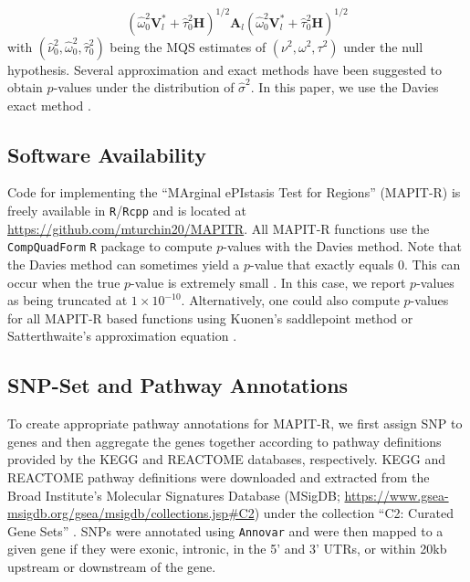 \documentclass[10pt]{article}
\newcommand{\bV}{\mathbf{V}}
\newcommand{\bA}{\mathbf{A}}
\newcommand{\bH}{\mathbf{H}}
\newcommand{\wh}{\widehat}
\begin{document}
\begin{equation*}
\left(\wh\omega^2_{0}\bV^*_l+\wh\tau^2_{0}\bH\right)^{1/2}\bA_{l}\left(\wh\omega^2_{0}\bV^*_l+\wh\tau^2_{0}\bH\right)^{1/2} 
\end{equation*}
with $(\wh\nu^2_{0},\wh\omega^2_{0},\wh\tau^2_{0})$ being the MQS estimates of $(\nu^2,\omega^2,\tau^2)$ under the null hypothesis. Several approximation and exact methods have been suggested to obtain $p$-values under the distribution of $\wh\sigma^2$. In this paper, we use the Davies exact method \cite{Davies1980,Wu2011}. 

\subsection*{Software Availability}

Code for implementing the ``MArginal ePIstasis Test for Regions'' (MAPIT-R) is freely available in \texttt{R}/\texttt{Rcpp} and is located at \url{https://github.com/mturchin20/MAPITR}. All MAPIT-R functions use the \texttt{CompQuadForm} \texttt{R} package to compute $p$-values with the Davies method. Note that the Davies method can sometimes yield a $p$-value that exactly equals 0. This can occur when the true $p$-value is extremely small \cite{Chen2013}. In this case, we report $p$-values as being truncated at $1\times10^{-10}$. Alternatively, one could also compute $p$-values for all MAPIT-R based functions using Kuonen's saddlepoint method \cite{Chen2013,Kuonen1999} or Satterthwaite's approximation equation \cite{Satterthwaite1946}.

\subsection*{SNP-Set and Pathway Annotations}

To create appropriate pathway annotations for MAPIT-R, we first assign SNP to genes and then aggregate the genes together according to pathway definitions provided by the KEGG and REACTOME databases, respectively. KEGG and REACTOME pathway definitions were downloaded and extracted from the Broad Institute's Molecular Signatures Database (MSigDB; \url{https://www.gsea-msigdb.org/gsea/msigdb/collections.jsp#C2}) under the collection ``C2: Curated Gene Sets'' \cite{Liberzon2011}. SNPs were annotated using \texttt{Annovar} \cite{Wang2010a} and were then mapped to a given gene if they were exonic, intronic, in the 5' and 3' UTRs, or within 20kb upstream or downstream of the gene.
\end{document}
